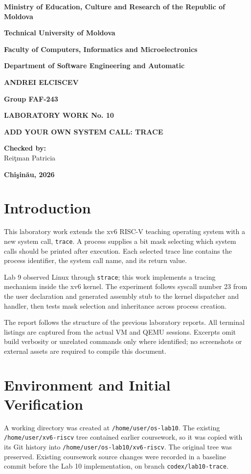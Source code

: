 \documentclass[12pt,a4paper]{article}
\begin{document}
\begin{titlepage}
\centering
\textbf{Ministry of Education, Culture and Research of the Republic of Moldova}\par\medskip
\textbf{Technical University of Moldova}\par\medskip
\textbf{Faculty of Computers, Informatics and Microelectronics}\par\medskip
\textbf{Department of Software Engineering and Automatic}\par
\vspace{2.5cm}
\textbf{ANDREI ELCISCEV}\par
\textbf{Group FAF-243}\par
\vspace{2cm}
{\Large\textbf{LABORATORY WORK No. 10}\par}
\medskip
{\Large\textbf{ADD YOUR OWN SYSTEM CALL: TRACE}\par}
\vspace{2cm}
\begin{flushright}
\textbf{Checked by:}\\
Rei\c{t}man Patricia
\end{flushright}
\vfill
\textbf{Chi\c{s}in\u{a}u, 2026}
\end{titlepage}
\tableofcontents
\newpage
\section{Introduction}
This laboratory work extends the xv6 RISC-V teaching operating system with a new
system call, \texttt{trace}. A process supplies a bit mask selecting which system
calls should be printed after execution. Each selected trace line contains the
process identifier, the system call name, and its return value.

Lab 9 observed Linux through \texttt{strace}; this work implements a tracing
mechanism inside the xv6 kernel. The experiment follows syscall number 23 from
the user declaration and generated assembly stub to the kernel dispatcher and
handler, then tests mask selection and inheritance across process creation.

The report follows the structure of the previous laboratory reports. All terminal
listings are captured from the actual VM and QEMU sessions. Excerpts omit build
verbosity or unrelated commands only where identified; no screenshots or external
assets are required to compile this document.

\section{Environment and Initial Verification}
A working directory was created at \texttt{/home/user/os-lab10}. The existing
\texttt{/home/user/xv6-riscv} tree contained earlier coursework, so it was copied
with its Git history into \texttt{/home/user/os-lab10/xv6-riscv}. The original tree
was preserved. Existing coursework source changes were recorded in a baseline
commit before the Lab 10 implementation, on branch \texttt{codex/lab10-trace}.
\end{document}
